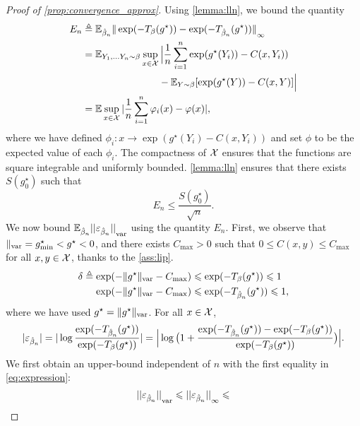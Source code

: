 \begin{proof}[Proof of \autoref{prop:convergence_approx}]
Using \autoref{lemma:lln}, we bound the quantity
\begin{align}
    E_n &\triangleq \EE_{\hat \beta_n} {\Vert \exp(-\Ctrans{g^\star}{\beta})
    - \exp(-\Ctrans{g^\star}{\hat \beta_n}) \Vert}_{\infty} \\
    &= \EE_{Y_1, \dots Y_n \sim \beta} 
    \sup_{x \in \Xx}
     \Big| \frac{1}{n} \sum_{i=1}^n \exp(g^\star(Y_i)) - C(x, Y_i)) \\
      &\phantom{=}\qquad\qquad\qquad\quad- \EE_{Y \sim \beta}[\exp(g^\star(Y)) - C(x, Y)] \Big| \\
      &= \EE \sup_{x \in \Xx} | \frac{1}{n} \sum_{i=1}^n \phi_i(x) - \phi(x) | ,
\end{align}
where we have defined $\phi_i: x \to \exp(g^\star(Y_i) - C(x, Y_i))$ and set
$\phi$ to be the expected value of each $\phi_i$. The compactness of $\Xx$
ensures that the functions  are square integrable and uniformly bounded.
\autoref{lemma:lln} ensures that there exists $S(g^\star_0)$ such that
\begin{equation}
    E_n \leq \frac{S(g^\star_0)}{\sqrt{n}}.
\end{equation}
We now bound $\EE_{\hat \beta_n} {|| \epsilon_{\hat \beta_n} ||}_\var$ using the
 quantity $E_n$. First, we observe that $\Vert_{\var} = g^\star_{\min} < g^\star
 < 0$, and there exists $C_{\max} > 0$ such that $0 \leq C(x, y) \leq C_{\max}$
 for all $x, y \in \Xx$, thanks to the \autoref{ass:lip}.
 \begin{align}
    \delta \triangleq \exp(-\Vert g^\star \Vert_{\var}
     - C_{\max}) &\leq \exp(-T_\beta(g^\star)) \leq 1 \\
    \exp(-\Vert g^\star \Vert_{\var}
     - C_{\max}) &\leq \exp(-T_{\hat \beta_n} 
    (g^\star)) \leq 1,
\end{align}
where we have used $g^\star = \Vert g^\star \Vert_{\var}$.
For all $x \in \Xx$, 
\begin{equation}\label{eq:expression}
    | \epsilon_{\hat \beta_n} | = 
    | \log \frac{\exp(-T_{\hat \beta_n}(g^\star))}{\exp(-T_\beta(g^\star))} | =
    \Big| \log\big(1 + 
    \frac{\exp(-\Ctrans{g^\star}{\hat \beta_n})
    -\exp(-\Ctrans{g^\star}{\beta})
    }
    {\exp(-\Ctrans{g^\star}{\beta})}\big) \Big|.
\end{equation}
We first obtain an upper-bound independent of $n$ with the first equality in
 \eqref{eq:expression}:
\begin{equation}\label{eq:const_ineq}
    {|| \varepsilon_{\hat \beta_n} ||}_{\var} \leq {|| \varepsilon_{\hat \beta_n} ||}_{\infty} \leq 

\end{equation}
\end{proof}
